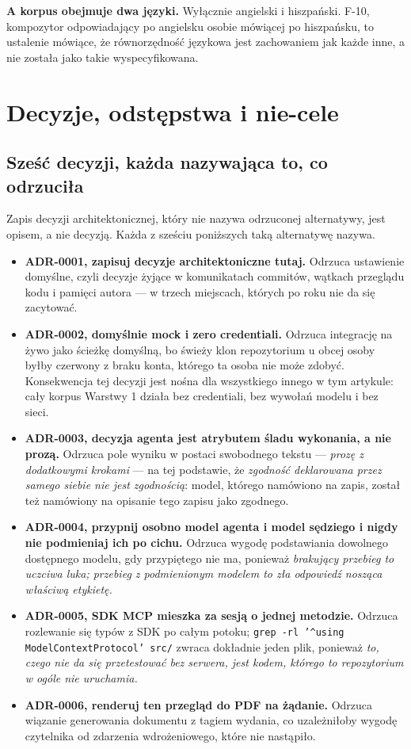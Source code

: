 \documentclass[11pt,a4paper]{article}
\begin{document}
\textbf{A korpus obejmuje dwa języki.} Wyłącznie angielski i hiszpański. F-10,
kompozytor odpowiadający po angielsku osobie mówiącej po hiszpańsku, to
ustalenie mówiące, że równorzędność językowa jest zachowaniem jak każde inne, a
nie została jako takie wyspecyfikowana.

\section{Decyzje, odstępstwa i nie-cele}

\subsection{Sześć decyzji, każda nazywająca to, co odrzuciła}

Zapis decyzji architektonicznej, który nie nazywa odrzuconej alternatywy, jest
opisem, a nie decyzją. Każda z sześciu poniższych taką alternatywę nazywa.

\begin{itemize}[leftmargin=*]
    \item \textbf{ADR-0001, zapisuj decyzje architektoniczne tutaj.} Odrzuca
    ustawienie domyślne, czyli decyzje żyjące w komunikatach commitów, wątkach
    przeglądu kodu i pamięci autora --- w trzech miejscach, których po roku nie
    da się zacytować.
    \item \textbf{ADR-0002, domyślnie mock i zero credentiali.} Odrzuca
    integrację na żywo jako ścieżkę domyślną, bo świeży klon repozytorium u
    obcej osoby byłby czerwony z braku konta, którego ta osoba nie może zdobyć.
    Konsekwencja tej decyzji jest nośna dla wszystkiego innego w tym artykule:
    cały korpus Warstwy 1 działa bez credentiali, bez wywołań modelu i bez sieci.
    \item \textbf{ADR-0003, decyzja agenta jest atrybutem śladu wykonania, a nie
    prozą.} Odrzuca pole wyniku w postaci swobodnego tekstu --- \emph{prozę z
    dodatkowymi krokami} --- na tej podstawie, że \emph{zgodność deklarowana
    przez samego siebie nie jest zgodnością}: model, którego namówiono na zapis,
    został też namówiony na opisanie tego zapisu jako zgodnego.
    \item \textbf{ADR-0004, przypnij osobno model agenta i model sędziego i nigdy
    nie podmieniaj ich po cichu.} Odrzuca wygodę podstawiania dowolnego
    dostępnego modelu, gdy przypiętego nie ma, ponieważ \emph{brakujący przebieg
    to uczciwa luka; przebieg z podmienionym modelem to zła odpowiedź nosząca
    właściwą etykietę.}
    \item \textbf{ADR-0005, SDK MCP mieszka za sesją o jednej metodzie.} Odrzuca
    rozlewanie się typów z SDK po całym potoku;
    \texttt{grep -rl '\textasciicircum{}using ModelContextProtocol' src/} zwraca dokładnie jeden plik,
    ponieważ \emph{to, czego nie da się przetestować bez serwera, jest kodem,
    którego to repozytorium w ogóle nie uruchamia.}
    \item \textbf{ADR-0006, renderuj ten przegląd do PDF na żądanie.} Odrzuca
    wiązanie generowania dokumentu z tagiem wydania, co uzależniłoby wygodę
    czytelnika od zdarzenia wdrożeniowego, które nie nastąpiło.
\end{itemize}
\end{document}
